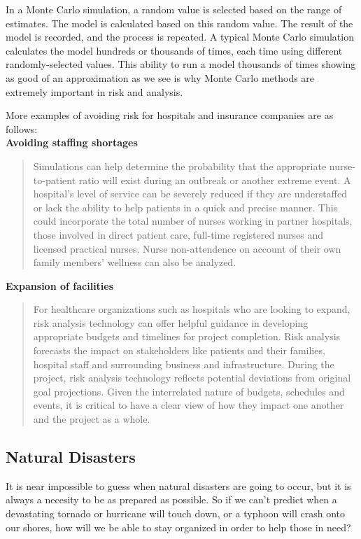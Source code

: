 \documentclass{article}
\begin{document}
In a Monte Carlo simulation, a random value is selected based on the range of estimates. The model is calculated based on this random value. The result of the model is recorded, and the process is repeated. A typical Monte Carlo simulation calculates the model hundreds or thousands of times, each time using different randomly-selected values. This ability to run a model thousands of times showing as good of an approximation as we see is why Monte Carlo methods are extremely important in risk and analysis.

More examples of avoiding risk for hospitals and insurance companies are as follows: \\

\textbf{Avoiding staffing shortages}
\begin{quote}
Simulations can help determine the probability that the appropriate nurse-to-patient ratio will exist during an outbreak or another extreme event. A hospital's level of service can be severely reduced if they are understaffed or lack the ability to help patients in a quick and precise manner. This could incorporate the total number of nurses working in partner hospitals, those involved in direct patient care,  full-time registered nurses and licensed practical nurses. Nurse non-attendence on account of their own family members' wellness can also be analyzed.
\end{quote}

\textbf{Expansion of facilities}
\begin{quote}
For healthcare organizations such as hospitals who are looking to expand, risk analysis technology can offer helpful guidance in developing appropriate budgets and timelines for project completion. Risk analysis forecasts the impact on stakeholders like patients and their families, hospital staff and surrounding business and infrastructure. During the project, risk analysis technology reflects potential deviations from original goal projections. Given the interrelated nature of budgets, schedules and events, it is critical to have a clear view of how they impact one another and the project as a whole.
\end{quote}

\subsection{Natural Disasters}
It is near impossible to guess when natural disasters are going to occur, but it is always a necesity to be as prepared as possible. So if we can't predict when a devastating tornado or hurricane will touch down, or a typhoon will crash onto our shores, how will we be able to stay organized in order to help those in need? \\
\end{document}
